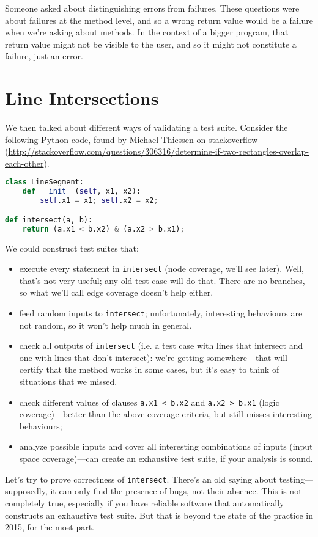 \documentclass[11pt]{article}
\begin{document}
Someone asked about distinguishing errors from failures. These
questions were about failures at the method level, and so a wrong
return value would be a failure when we're asking about methods. In
the context of a bigger program, that return value might not be
visible to the user, and so it might not constitute a failure, just an
error.

\section*{Line Intersections}
We then talked about different ways of validating a test suite.
Consider the following Python code, found by Michael Thiessen
on stackoverflow (\url{http://stackoverflow.com/questions/306316/determine-if-two-rectangles-overlap-each-other}).

\begin{lstlisting}[language=python]
class LineSegment:
    def __init__(self, x1, x2):
        self.x1 = x1; self.x2 = x2;

def intersect(a, b):
    return (a.x1 < b.x2) & (a.x2 > b.x1);
\end{lstlisting}

We could construct test suites that:
\begin{itemize}
\item execute every statement in {\tt intersect} (node coverage,
  we'll see later). Well, that's not very useful; any old test case
  will do that. There are no branches, so what we'll call edge coverage
  doesn't help either.
\item feed random inputs to {\tt intersect}; unfortunately,
  interesting behaviours are not random, so it won't help much
  in general.
\item check all outputs of {\tt intersect} (i.e. a test case with
  lines that intersect and one with lines that don't intersect): we're
  getting somewhere---that will certify that the method works in some
  cases, but it's easy to think of situations that we missed.
\item check different values of clauses {\tt a.x1 < b.x2} and {\tt a.x2 > b.x1} (logic coverage)---better than the above coverage criteria, but still misses interesting behaviours;
  \item analyze possible inputs and cover all interesting combinations of inputs (input space coverage)---can create an exhaustive test suite, if your analysis is sound.
\end{itemize}

Let's try to prove correctness of {\tt intersect}. There's an old
saying about testing---supposedly, it can only find the presence of
bugs, not their absence. This is not completely true, especially if
you have reliable software that automatically constructs an exhaustive
test suite.  But that is beyond the state of the practice in 2015, for
the most part.
\end{document}
